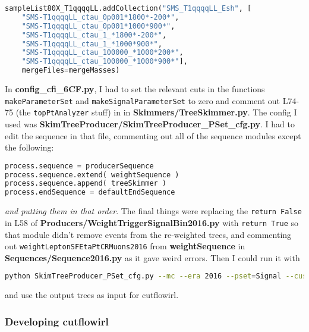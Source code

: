 \begin{lstlisting}[belowskip=-0.7cm, language=python, numbers=none]
sampleList80X_T1qqqqLL.addCollection("SMS_T1qqqqLL_Esh", [
    "SMS-T1qqqqLL_ctau_0p001*1800*-200*",
    "SMS-T1qqqqLL_ctau_0p001*1000*900*",
    "SMS-T1qqqqLL_ctau_1_*1800*-200*",
    "SMS-T1qqqqLL_ctau_1_*1000*900*",
    "SMS-T1qqqqLL_ctau_100000_*1000*200*",
    "SMS-T1qqqqLL_ctau_100000_*1000*900*"],
    mergeFiles=mergeMasses) 
\end{lstlisting}

In \textbf{config\_cfi\_6CF.py}, I had to set the relevant cuts in the functions \texttt{makeParameterSet} and \texttt{makeSignalParameterSet} to zero and comment out L74-75 (the \texttt{topPtAnalyzer} stuff) in in \textbf{Skimmers/TreeSkimmer.py}. The config I used was \textbf{SkimTreeProducer/SkimTreeProducer\_PSet\_cfg.py}. I had to edit the sequence in that file, commenting out all of the sequence modules except the following:

\begin{lstlisting}[belowskip=-0.7cm, language=python, numbers=none]
process.sequence = producerSequence
process.sequence.extend( weightSequence )
process.sequence.append( treeSkimmer )
process.endSequence = defaultEndSequence
\end{lstlisting}

\emph{and putting them in that order}. The final things were replacing the \texttt{return False} in L58 of \textbf{Producers/WeightTriggerSignalBin2016.py} with \texttt{return True} so that module didn't remove events from the re-weighted trees, and commenting out \texttt{weightLeptonSFEtaPtCRMuons2016} from \textbf{weightSequence} in \textbf{Sequences/Sequence2016.py} as it gave weird errors. Then I could run it with

\begin{lstlisting}[belowskip=-0.7cm, language=sh, numbers=none]
python SkimTreeProducer_PSet_cfg.py --mc --era 2016 --pset=Signal --customSamples SMS_T1qqqqLL_Esh --outDir <blah>
\end{lstlisting}

and use the output trees as input for cutflowirl.

\subsubsection{Developing cutflowirl}

